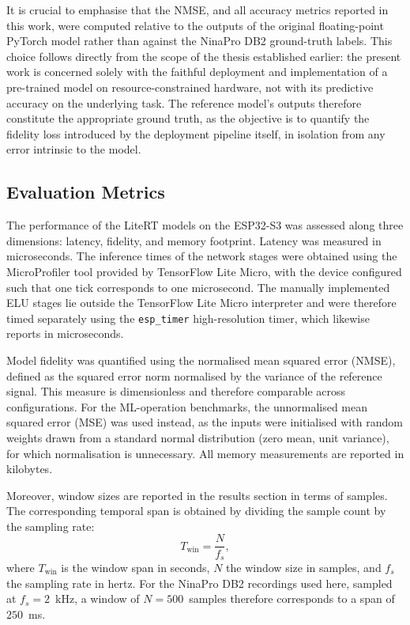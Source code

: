 \documentclass[12pt,DIV16,BCOR12mm,a4paper,footinclude=false,headinclude,parskip=half-,twoside,openright,cleardoublepage=empty,toc=index,bibliography=totoc,listof=totoc]{scrreprt}
\numberwithin{equation}{chapter}
\begin{document}
  It is crucial to emphasise that the NMSE, and all accuracy metrics reported in this work,
  were computed relative to the outputs of the original floating-point PyTorch model rather
  than against the NinaPro DB2 ground-truth labels. This choice follows directly from the
  scope of the thesis established earlier: the present work is concerned solely with the
  faithful deployment and implementation of a pre-trained model on resource-constrained
  hardware, not with its predictive accuracy on the underlying task. The reference model's
  outputs therefore constitute the appropriate ground truth, as the objective is to quantify
  the fidelity loss introduced by the deployment pipeline itself, in isolation from any error
  intrinsic to the model.

  \subsection{Evaluation Metrics}
  The performance of the LiteRT models on the ESP32-S3 was assessed along three
  dimensions: latency, fidelity, and memory footprint. Latency was measured in
  microseconds. The inference times of the network stages were obtained using the
  MicroProfiler tool provided by TensorFlow Lite Micro, with the device
  configured such that one tick corresponds to one microsecond. The manually
  implemented ELU stages lie outside the TensorFlow Lite Micro interpreter and
  were therefore timed separately using the \texttt{esp\_timer} high-resolution
  timer, which likewise reports in microseconds.

  Model fidelity was quantified using the normalised mean squared error (NMSE),
  defined as the squared error norm normalised by the variance of the reference
  signal. This measure is dimensionless and therefore comparable across
  configurations. For the ML-operation benchmarks, the unnormalised mean squared
  error (MSE) was used instead, as the inputs were initialised with random
  weights drawn from a standard normal distribution (zero mean, unit variance),
  for which normalisation is unnecessary. All memory measurements are reported in
  kilobytes.

  Moreover, window sizes are reported in the results section in terms of samples.
  The corresponding temporal span is obtained by dividing the sample count by the
  sampling rate:
  \begin{equation}
    T_{\text{win}} = \frac{N}{f_s},
  \end{equation}
  where $T_{\text{win}}$ is the window span in seconds, $N$ the window size in
  samples, and $f_s$ the sampling rate in hertz. For the NinaPro DB2 recordings
  used here, sampled at $f_s = 2$~kHz, a window of $N = 500$~samples therefore
  corresponds to a span of $250$~ms.
\end{document}
